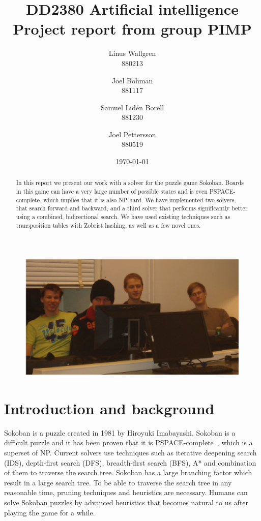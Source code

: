 \documentclass[a4paper,12pt]{article}
\title{
    {\sc DD2380 Artificial intelligence} \\
    Project report from group PIMP
}
\author{
    \small
    Linus Wallgren \\ 880213 \and
    Joel Bohman \\ 881117 \and
    Samuel Lidén Borell \\ 881230 \and
    Joel Pettersson \\ 880519 
}
\date{\today}
\renewcommand{\*}[0]{\cdot}
\begin{document}
\maketitle

\begin{figure}[h!]
    \begin{center}
        \includegraphics{figures/gruppbild}
    \end{center}
\end{figure}

\thispagestyle{empty}
\newpage
\begin{abstract}
    In this report we present our work with a solver for the puzzle game
    Sokoban. Boards in this game can have a very large number of possible
    states and is even PSPACE-complete, which implies that it is also NP-hard.
    We have implemented two solvers, that search forward and backward, and a
    third solver that performs significantly better using a combined,
    bidirectional search. We have used existing techniques such as
    transposition tables with Zobrist hashing, as well as a few novel ones.
\end{abstract}
\thispagestyle{empty}
\newpage
\setcounter{page}{1}


\part*{Introduction and background}


Sokoban is a puzzle created in 1981 by Hiroyuki Imabayashi. Sokoban is a
difficult puzzle and it has been proven that it is
PSPACE-complete~\cite{culberson1997}, which is a superset of NP. Current
solvers use techniques such as iterative deepening search (IDS), depth-first
search (DFS), breadth-first search (BFS), A* and combination of them to
traverse the search tree. Sokoban has a large branching factor which result in
a large search tree. To be able to traverse the search tree in any reasonable
time, pruning techniques and heuristics are necessary. Humans can solve
Sokoban puzzles by advanced heuristics that becomes natural to us after playing
the game for a while.
\end{document}
